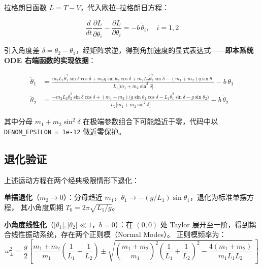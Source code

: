 拉格朗日函数 $L = T - V$，代入欧拉--拉格朗日方程：

\begin{equation}
  \frac{d}{dt}\frac{\partial L}{\partial \dot{\theta}_i} - \frac{\partial L}{\partial \theta_i} = -b\,\dot{\theta}_i, \quad i = 1,2
\label{eq:euler_lagrange}
\end{equation}

引入角度差 $\delta = \theta_2 - \theta_1$，经矩阵求逆，得到角加速度的显式表达式——\textbf{即本系统 ODE 右端函数的实现依据}：

\begin{equation}
\boxed{
\begin{aligned}
\ddot{\theta}_1 &= \frac{m_2 L_1 \dot{\theta}_1^2 \sin\delta\cos\delta
                  + m_2 g \sin\theta_2 \cos\delta
                  + m_2 L_2 \dot{\theta}_2^2 \sin\delta
                  - (m_1+m_2)g\sin\theta_1}
                  {L_1\bigl[m_1 + m_2\sin^2\delta\bigr]} - b\,\dot{\theta}_1 \\[1.5em]
\ddot{\theta}_2 &= \frac{-m_2 L_2 \dot{\theta}_2^2 \sin\delta\cos\delta
                  + (m_1+m_2)\bigl(g\sin\theta_1\cos\delta
                  - L_1\dot{\theta}_1^2\sin\delta
                  - g\sin\theta_2\bigr)}
                  {L_2\bigl[m_1 + m_2\sin^2\delta\bigr]} - b\,\dot{\theta}_2
\end{aligned}
}
\label{eq:ode_system}
\end{equation}

其中分母 $m_1 + m_2\sin^2\delta$ 在极端参数组合下可能趋近于零，代码中以 \texttt{DENOM\_EPSILON = 1e-12} 做近零保护。

\subsection{退化验证}

上述运动方程在两个经典极限情形下退化：

\textbf{单摆退化}（$m_2 \to 0$）：分母趋近 $m_1$，$\ddot{\theta}_1 \to -(g/L_1)\sin\theta_1$，退化为标准单摆方程，
其小角度周期 $T_0 = 2\pi\sqrt{L_1/g}$。

\textbf{小角度线性化}（$|\theta_1|,|\theta_2| \ll 1$，$b = 0$）：在 $(0,0)$ 处 Taylor 展开至一阶，得到耦合线性振动系统，存在两个正则模（Normal Modes）。
正则模频率为：
\begin{equation}
  \omega^2_{\pm} = \frac{g}{2}\left[\frac{m_1+m_2}{m_1}\left(\frac{1}{L_1}+\frac{1}{L_2}\right)
                   \pm \sqrt{\left(\frac{m_1+m_2}{m_1}\right)^2\left(\frac{1}{L_1}+\frac{1}{L_2}\right)^2
                   - \frac{4(m_1+m_2)}{m_1 L_1 L_2}}\,\right]
\label{eq:normal_modes}
\end{equation}

